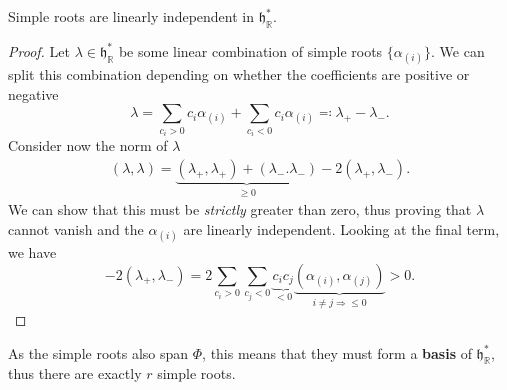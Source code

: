\documentclass[11pt,fleqn]{article}
\renewenvironment{prop}{\begin{pBox}\begin{propT}}{\end{propT}\end{pBox}}
\begin{document}
\begin{prop}
	Simple roots are linearly independent in $\mathfrak{h}^*_{\mathbb{R}}$.
\end{prop}
\begin{proof}
	Let $\lambda \in \mathfrak{h}^*_\mathbb{R}$ be some linear combination of simple roots  $\{ \alpha_{(i)} \}$. We can split this combination depending on whether the coefficients are positive or negative
		\begin{equation}
			\lambda = \sum_{c_i > 0} c_i \alpha_{(i)} + \sum_{c_i < 0} c_i \alpha_{(i)} \eqqcolon \lambda_+ - \lambda_-.
		\end{equation}
	Consider now the norm of $\lambda$
		\begin{align}
			(\lambda, \lambda) = \underbrace{(\lambda_+, \lambda_+) + (\lambda_-.\lambda_-)}_{\geq 0} -2 (\lambda_+, \lambda_-).
		\end{align}
	We can show that this must be \textit{strictly} greater than zero, thus proving that $\lambda$ cannot vanish and the $\alpha_{(i)}$ are linearly independent. Looking at the final term, we have
		\begin{equation}
			-2(\lambda_+, \lambda_-) = 2 \sum_{c_i > 0} \sum_{c_j<0} \underbrace{c_i c_j}_{ < 0} \underbrace{(\alpha_{(i)}, \alpha_{(j)})}_{i \neq j \Rightarrow \leq 0} > 0.
		\end{equation}
\end{proof}

\begin{remark}
	As the simple roots also span $\Phi$, this means that they must form a \textbf{basis} of $\mathfrak{h}^*_\mathbb{R}$, thus there are exactly $r$ simple roots.
\end{remark}
\end{document}

